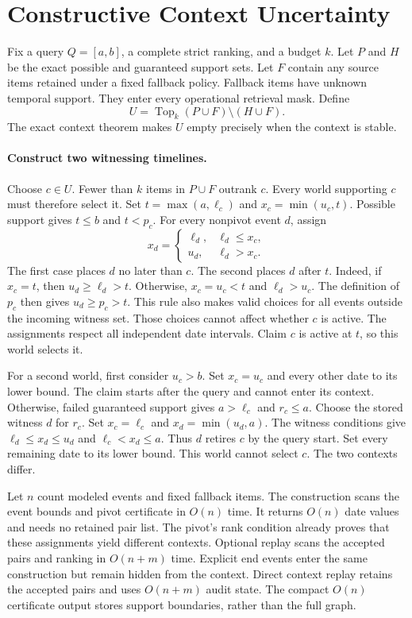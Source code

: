 \section{Constructive Context Uncertainty}
\label{app:refinement}

Fix a query $Q=[a,b]$, a complete strict ranking, and a budget $k$.
Let $P$ and $H$ be the exact possible and guaranteed support sets.
Let $F$ contain any source items retained under a fixed fallback policy.
Fallback items have unknown temporal support.
They enter every operational retrieval mask.
Define
\[
 U=\operatorname{Top}_k(P\cup F)\setminus(H\cup F).
\]
The exact context theorem makes $U$ empty precisely when the context is stable.

\paragraph{Construct two witnessing timelines.}
Choose $c\in U$.
Fewer than $k$ items in $P\cup F$ outrank $c$.
Every world supporting $c$ must therefore select it.
Set $t=\max(a,\ell_c)$ and $x_c=\min(u_c,t)$.
Possible support gives $t\le b$ and $t<p_c$.
For every nonpivot event $d$, assign
\[
 x_d=\begin{cases}
 \ell_d,&\ell_d\le x_c,\\
 u_d,&\ell_d>x_c.
 \end{cases}
\]
The first case places $d$ no later than $c$.
The second places $d$ after $t$.
Indeed, if $x_c=t$, then $u_d\ge \ell_d>t$.
Otherwise, $x_c=u_c<t$ and $\ell_d>u_c$.
The definition of $p_c$ then gives $u_d\ge p_c>t$.
This rule also makes valid choices for all events outside the incoming witness set.
Those choices cannot affect whether $c$ is active.
The assignments respect all independent date intervals.
Claim $c$ is active at $t$, so this world selects it.

For a second world, first consider $u_c>b$.
Set $x_c=u_c$ and every other date to its lower bound.
The claim starts after the query and cannot enter its context.
Otherwise, failed guaranteed support gives $a>\ell_c$ and $r_c\le a$.
Choose the stored witness $d$ for $r_c$.
Set $x_c=\ell_c$ and $x_d=\min(u_d,a)$.
The witness conditions give $\ell_d\le x_d\le u_d$ and $\ell_c<x_d\le a$.
Thus $d$ retires $c$ by the query start.
Set every remaining date to its lower bound.
This world cannot select $c$.
The two contexts differ.

Let $n$ count modeled events and fixed fallback items.
The construction scans the event bounds and pivot certificate in $O(n)$ time.
It returns $O(n)$ date values and needs no retained pair list.
The pivot's rank condition already proves that these assignments yield different contexts.
Optional replay scans the accepted pairs and ranking in $O(n+m)$ time.
Explicit end events enter the same construction but remain hidden from the context.
Direct context replay retains the accepted pairs and uses $O(n+m)$ audit state.
The compact $O(n)$ certificate output stores support boundaries, rather than the full graph.

